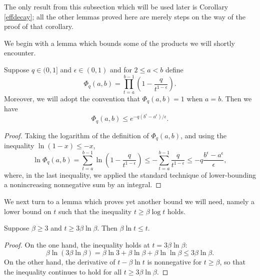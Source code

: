 \documentclass[final]{siamltex}
\begin{document}
The only result from this subsection which will be used later is Corollary \ref{effdecay}; all the other lemmas proved here are merely steps on the way of the 
proof of that corollary. 

We begin with a lemma which bounds some of the products we will shortly encounter.

\smallskip

\begin{lemma} Suppose $q \in (0,1]$ and $\epsilon \in (0,1)$ and for $2 \leq a < b$ define  \[ \Phi_q(a,b) = \prod_{t=a}^{b-1} \left( 1 - \frac{q}{t^{1-\epsilon}} \right). \] Moreover, we will adopt the convention that $\Phi_q(a,b)=1$ when $a=b$. Then we have 
\[ \Phi_q(a,b) \leq e^{-q(b^{\epsilon} - a^{\epsilon})/\epsilon}. \] \label{phibound}
\end{lemma}

\smallskip

\begin{proof} Taking the logarithm of the definition of $\Phi_q(a,b)$, and using the inequality $\ln(1-x) \leq -x$,
\[ \ln \Phi_q(a,b) = \sum_{t=a}^{b-1} \ln \left( 1 - \frac{q}{t^{1-\epsilon}} \right) \leq - \sum_{t=a}^{b-1} \frac{q}{t^{1-\epsilon}}
\leq  -q \frac{b^{\epsilon} - a^{\epsilon}}{\epsilon}, \] where, in the last inequality, we applied the standard technique of lower-bounding a 
nonincreasing nonnegative sum by an integral. 
\end{proof} 

\smallskip

We next turn to a lemma which proves yet another bound we will need, namely a lower bound on $t$ such that
the inequality $t \geq \beta \log t$ holds. 

\smallskip

\begin{lemma} Suppose $\beta \geq 3$ and $t \geq  3 \beta \ln \beta$. Then $\beta \ln t \leq t$. \label{betabound}
\end{lemma} 

\smallskip

\begin{proof}  On the one hand, the inequality holds at $t= 3 \beta \ln \beta$:
\[ \beta \ln (3 \beta \ln \beta) = \beta \ln 3 + \beta \ln \beta + \beta \ln \ln \beta \leq 3 \beta \ln \beta. \] On the other hand, 
the derivative of $t - \beta \ln t$ is nonnegative for $t \geq \beta$, so that the inequality continues to hold for all $t \geq 3 \beta \ln \beta$. 
\end{proof} 
\end{document}
